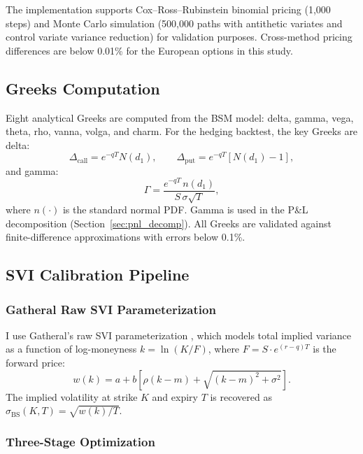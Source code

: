 \documentclass[12pt, letterpaper]{article}
\begin{document}
The implementation supports Cox--Ross--Rubinstein binomial pricing (1,000 steps) and Monte Carlo simulation (500,000 paths with antithetic variates and control variate variance reduction) for validation purposes. Cross-method pricing differences are below 0.01\% for the European options in this study.

\subsection{Greeks Computation}
\label{sec:greeks}

Eight analytical Greeks are computed from the BSM model: delta, gamma, vega, theta, rho, vanna, volga, and charm. For the hedging backtest, the key Greeks are delta:
\begin{equation}
    \Delta_{\text{call}} = e^{-qT} N(d_1), \qquad \Delta_{\text{put}} = e^{-qT}[N(d_1) - 1],
    \label{eq:delta}
\end{equation}
and gamma:
\begin{equation}
    \Gamma = \frac{e^{-qT}\, n(d_1)}{S \, \sigma \sqrt{T}},
    \label{eq:gamma}
\end{equation}
where $n(\cdot)$ is the standard normal PDF. Gamma is used in the P\&L decomposition (Section~\ref{sec:pnl_decomp}). All Greeks are validated against finite-difference approximations with errors below 0.1\%.

\subsection{SVI Calibration Pipeline}
\label{sec:svi_calibration}

\subsubsection{Gatheral Raw SVI Parameterization}

I use Gatheral's raw SVI parameterization \citep{Gatheral2004}, which models total implied variance as a function of log-moneyness $k = \ln(K/F)$, where $F = S \cdot e^{(r-q)T}$ is the forward price:
\begin{equation}
    w(k) = a + b\left[\rho(k - m) + \sqrt{(k - m)^2 + \sigma^2}\right].
    \label{eq:svi_raw}
\end{equation}
The implied volatility at strike $K$ and expiry $T$ is recovered as $\sigma_{\text{BS}}(K, T) = \sqrt{w(k) / T}$.

\subsubsection{Three-Stage Optimization}
\end{document}
